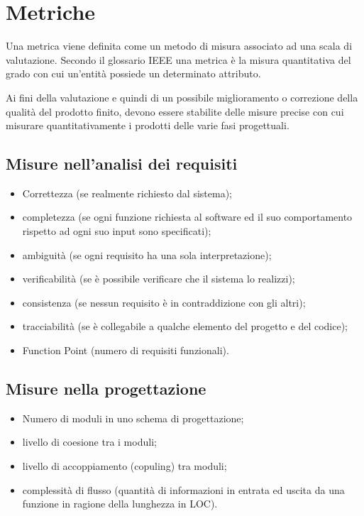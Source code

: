 \section{Metriche}

Una metrica viene definita come un metodo di misura associato ad una scala di
valutazione. Secondo il glossario IEEE una metrica \`e la misura quantitativa del
grado con cui un'entit\`a possiede un determinato attributo.

Ai fini della valutazione e quindi di un possibile miglioramento o
correzione della qualit\`a del prodotto finito, devono essere stabilite delle
misure precise con cui misurare quantitativamente i prodotti delle varie fasi
progettuali.


\subsection{Misure nell'analisi dei requisiti}

\begin{itemize}
  
\item Correttezza (se realmente richiesto dal sistema);
\item completezza (se ogni funzione richiesta al software ed il suo
comportamento rispetto ad ogni suo input sono specificati);
\item ambiguit\`a (se ogni requisito ha una sola interpretazione);
\item verificabilit\`a (se \`e possibile verificare che il sistema lo realizzi);
\item consistenza (se nessun requisito \`e in contraddizione con gli altri);
\item tracciabilit\`a (se \`e collegabile a qualche elemento del progetto e del
codice);
\item Function Point (numero di requisiti funzionali).

\end{itemize}


\subsection{Misure nella progettazione}

\begin{itemize}
  
\item Numero di moduli in uno schema di progettazione;
\item livello di coesione tra i moduli;
\item livello di accoppiamento (copuling) tra moduli;
\item complessit\`a di flusso (quantit\`a di informazioni in entrata ed uscita da
una funzione in ragione della lunghezza in LOC).

\end{itemize}


